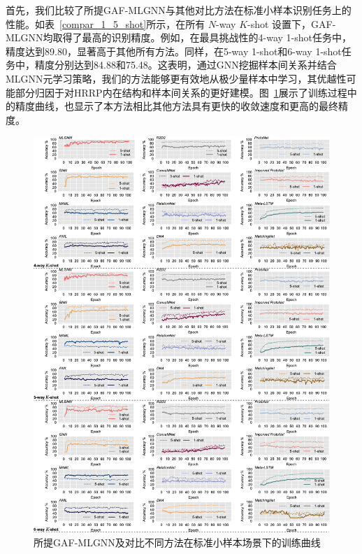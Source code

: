 首先，我们比较了所提GAF-MLGNN与其他对比方法在标准小样本识别任务上的性能。如表~\ref{compar_1_5_shot}所示，在所有 $N$-way $K$-shot 设置下，GAF-MLGNN均取得了最高的识别精度。例如，在最具挑战性的4-way 1-shot任务中，精度达到89.80，显著高于其他所有方法。同样，在5-way 1-shot和6-way 1-shot任务中，精度分别达到84.88和75.48。这表明，通过GNN挖掘样本间关系并结合MLGNN元学习策略，我们的方法能够更有效地从极少量样本中学习，其优越性可能部分归因于对HRRP内在结构和样本间关系的更好建模。图~\ref{fig:curves}展示了训练过程中的精度曲线，也显示了本方法相比其他方法具有更快的收敛速度和更高的最终精度。

\begin{figure}[h]
    \centering
    \includegraphics[width=\linewidth]{figures/curves_chap4.pdf}
    \caption{所提GAF-MLGNN及对比不同方法在标准小样本场景下的训练曲线}
    \label{fig:curves}
\end{figure}

